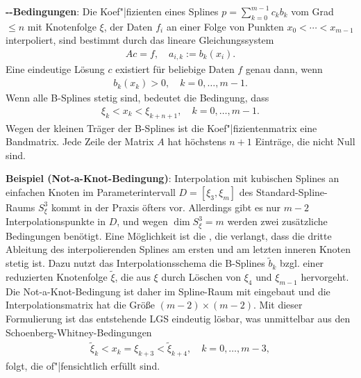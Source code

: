 \textbf{--Bedingungen}:
Die Koef"|fizienten eines Splines $p = \sum_{k=0}^{m-1} c_k b_k$
vom Grad $\le n$ mit Knotenfolge $\xi$,
der Daten $f_i$ an einer Folge von Punkten $x_0 < \dotsb < x_{m-1}$ interpoliert,
sind bestimmt durch das lineare Gleichungssystem
\begin{align*}
    Ac = f,\quad
    a_{i,k} := b_k(x_i).
\end{align*}
Eine eindeutige Lösung $c$ existiert für beliebige Daten $f$ genau dann, wenn
\begin{align*}
    b_k(x_k) > 0,\quad
    k = 0, \dotsc, m - 1.
\end{align*}
Wenn alle B-Splines stetig sind, bedeutet die Bedingung, dass
\begin{align*}
    \xi_k < x_k < \xi_{k+n+1},\quad
    k = 0, \dotsc, m - 1.
\end{align*}
Wegen der kleinen Träger der B-Splines ist die Koef"|fizientenmatrix eine Bandmatrix.
Jede Zeile der Matrix $A$ hat höchstens $n + 1$ Einträge, die nicht Null sind.

\linie

\textbf{Beispiel (Not-a-Knot-Bedingung)}:
Interpolation mit kubischen Splines an einfachen Knoten im Parameterintervall $D = [\xi_3, \xi_m]$
des Standard-Spline-Raums $S_\xi^3$ kommt in der Praxis öfters vor.
Allerdings gibt es nur $m - 2$ Interpolationspunkte in $D$, und wegen $\dim S_\xi^3 = m$
werden zwei zusätzliche Bedingungen benötigt.
Eine Möglichkeit ist die , die verlangt,
dass die dritte Ableitung des interpolierenden Splines am ersten und am letzten inneren Knoten
stetig ist.
Dazu nutzt das Interpolationsschema die B-Splines $\widetilde{b}_k$ bzgl. einer
reduzierten Knotenfolge $\widetilde{\xi}$, die aus $\xi$ durch Löschen von $\xi_4$ und $\xi_{m-1}$
hervorgeht.
Die Not-a-Knot-Bedingung ist daher im Spline-Raum mit eingebaut und die
Interpolationsmatrix hat die Größe $(m - 2) \times (m - 2)$.
Mit dieser Formulierung ist das entstehende LGS eindeutig lösbar, was unmittelbar
aus den Schoenberg-Whitney-Bedingungen
\begin{align*}
    \widetilde{\xi}_k < x_k = \xi_{k+3} < \widetilde{\xi}_{k+4},\quad
    k = 0, \dotsc, m - 3,
\end{align*}
folgt, die of"|fensichtlich erfüllt sind.

\linie
\pagebreak

